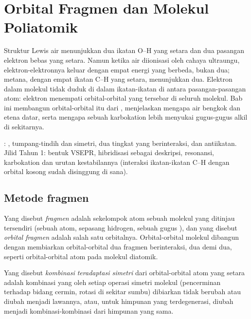 \chapter{Orbital Fragmen dan Molekul Poliatomik}\label{ch:b2:fragment-orbitals}

Struktur Lewis air menunjukkan dua ikatan O--H yang setara dan dua pasangan
elektron bebas yang setara. Namun ketika air diionisasi oleh cahaya
ultraungu, elektron-elektronnya keluar dengan empat energi yang berbeda,
bukan dua; metana, dengan empat ikatan C--H yang setara, menunjukkan dua.
Elektron dalam molekul tidak duduk di dalam ikatan-ikatan di antara
pasangan-pasangan atom: elektron menempati orbital-orbital yang tersebar
di seluruh molekul. Bab ini membangun orbital-orbital itu dari , menjelaskan mengapa air bengkok dan etena datar, serta mengapa
sebuah karbokation lebih menyukai gugus-gugus alkil di sekitarnya.

\begin{recall}
: , tumpang-tindih dan simetri, dua tingkat yang
berinteraksi,  dan antiikatan. Jilid Tahun 1: bentuk VSEPR,
hibridisasi sebagai deskripsi, resonansi, karbokation dan urutan
kestabilannya (interaksi ikatan-ikatan C--H dengan orbital kosong sudah
disinggung di sana).
\end{recall}

\section{Metode fragmen}

\begin{definition}[Fragmen]\label{def:b2:fragment-orbitals:fragment}
Yang disebut \emph{fragmen} adalah sekelompok atom sebuah
molekul yang ditinjau tersendiri (sebuah atom, sepasang hidrogen, sebuah
gugus ), dan yang disebut \emph{orbital fragmen}
adalah salah satu orbitalnya. Orbital-orbital molekul dibangun dengan
membiarkan orbital-orbital dua fragmen berinteraksi, dua demi dua, seperti
orbital-orbital atom pada molekul diatomik.
\end{definition}

\begin{definition}\label{def:b2:fragment-orbitals:symmetry-adapted}
Yang disebut
\emph{kombinasi teradaptasi simetri}
dari orbital-orbital atom yang setara adalah
kombinasi yang oleh setiap operasi simetri molekul (pencerminan terhadap
bidang cermin, rotasi di sekitar sumbu) dibiarkan tidak berubah atau diubah
menjadi lawannya, atau, untuk himpunan yang terdegenerasi, diubah menjadi
kombinasi-kombinasi dari himpunan yang sama.
\end{definition}

